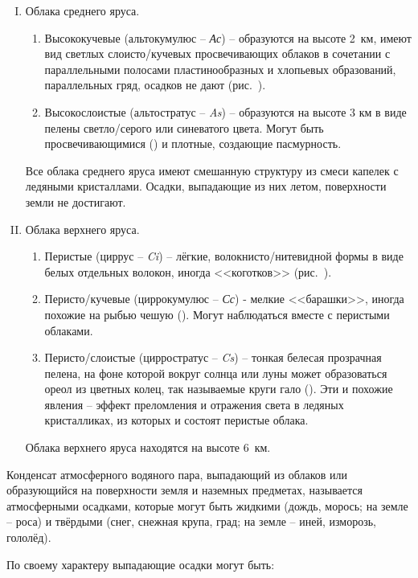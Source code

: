 \begin{enumerate}[I.]
\item Облака среднего яруса.
  \begin{enumerate}[1)]
  \item Высококучевые (альтокумулюс \--- \textit{Ас}) \--- образуются
    на высоте 2~км, имеют вид светлых слоисто\-/кучевых
    просвечивающих облаков в сочетании с параллельными полосами
    пластинообразных и хлопьевых образований, параллельных гряд,
    осадков не дают (рис.~).
  \item Высокослоистые (альтостратус \--- \textit{As}) \--- образуются
    на высоте 3 км в виде пелены светло\-/серого или синеватого
    цвета. Могут быть просвечивающимися () и плотные, создающие
    пасмурность.
  \end{enumerate}
  Все облака среднего яруса имеют смешанную структуру из смеси капелек с ледяными кристаллами. Осадки, выпадающие из них летом, поверхности земли не достигают.
  
\item Облака верхнего яруса. 
  \begin{enumerate}[1)]
  \item Перистые (циррус \--- \textit{Ci}) \--- лёгкие,
    волокнисто\-/нитевидной формы в виде белых отдельных волокон,
    иногда <<коготков>> (рис.~).
  \item Перисто\-/кучевые (циррокумулюс \--- \textit{Сс}) - мелкие
    <<барашки>>, иногда похожие на рыбью чешую (). Могут наблюдаться
    вместе с перистыми облаками.
  \item Перисто\-/слоистые (цирростратус \--- \textit{Cs}) \--- тонкая
    белесая прозрачная пелена, на фоне которой вокруг солнца или луны
    может образоваться ореол из цветных колец, так называемые круги
    гало (). Эти и похожие явления \--- эффект преломления и отражения
    света в ледяных кристалликах, из которых и состоят перистые
    облака.
    \end{enumerate}
    Облака верхнего яруса находятся на высоте 6~км.
\end{enumerate}

Конденсат атмосферного водяного пара, выпадающий из облаков или
образующийся на поверхности земля и наземных предметах, называется
атмосферными  осадками, которые могут быть
жидкими (дождь, морось; на земле \--- роса) и твёрдыми (снег, снежная
крупа, град; на земле \--- иней, изморозь, гололёд).

По своему характеру выпадающие осадки могут быть:

